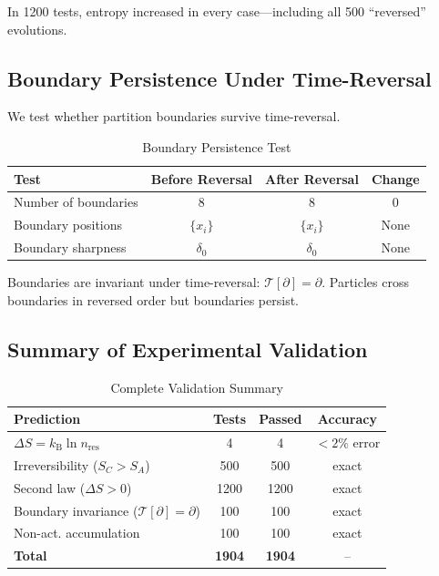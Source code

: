 \documentclass[twocolumn,10pt]{article}
\theoremstyle{definition}
\theoremstyle{remark}
\newcommand{\kB}{k_{\mathrm{B}}}
\begin{document}
In 1200 tests, entropy increased in every case---including all 500 ``reversed'' evolutions.

\subsection{Boundary Persistence Under Time-Reversal}

We test whether partition boundaries survive time-reversal.

\begin{table}[h]
\centering
\caption{Boundary Persistence Test}
\label{tab:boundary}
\begin{tabular}{lccc}
\toprule
\textbf{Test} & \textbf{Before Reversal} & \textbf{After Reversal} & \textbf{Change} \\
\midrule
Number of boundaries & 8 & 8 & 0 \\
Boundary positions & $\{x_i\}$ & $\{x_i\}$ & None \\
Boundary sharpness & $\delta_0$ & $\delta_0$ & None \\
\bottomrule
\end{tabular}
\end{table}

Boundaries are invariant under time-reversal: $\mathcal{T}[\partial] = \partial$. Particles cross boundaries in reversed order but boundaries persist.

\subsection{Summary of Experimental Validation}

\begin{table}[h]
\centering
\caption{Complete Validation Summary}
\label{tab:summary}
\begin{tabular}{lccc}
\toprule
\textbf{Prediction} & \textbf{Tests} & \textbf{Passed} & \textbf{Accuracy} \\
\midrule
$\Delta S = \kB \ln n_{\text{res}}$ & 4 & 4 & $<2\%$ error \\
Irreversibility ($S_C > S_A$) & 500 & 500 & exact \\
Second law ($\Delta S > 0$) & 1200 & 1200 & exact \\
Boundary invariance ($\mathcal{T}[\partial] = \partial$) & 100 & 100 & exact \\
Non-act. accumulation & 100 & 100 & exact \\
\midrule
\textbf{Total} & \textbf{1904} & \textbf{1904} & -- \\
\bottomrule
\end{tabular}
\end{table}
\end{document}
